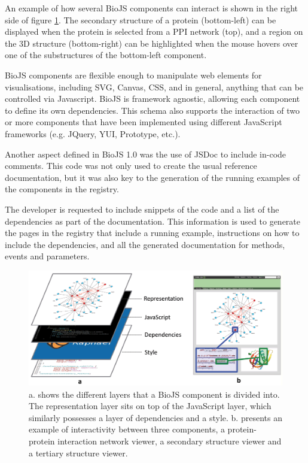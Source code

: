 An example of how several BioJS components can interact is shown in the right side of figure \ref{fig:biojs_layers}. The secondary structure of a protein (bottom-left) can be displayed when the protein is selected from a PPI network (top), and a region on the 3D structure (bottom-right) can be highlighted when the mouse hovers over one of the substructures of the bottom-left component.

BioJS components are flexible enough to manipulate web elements for visualisations, including SVG, Canvas, CSS, and in general, anything that can be controlled via Javascript. BioJS is framework agnostic, allowing each component to define its own dependencies. This schema also supports the interaction of two or more components that have been implemented using different JavaScript frameworks (e.g. JQuery, YUI, Prototype, etc.).
 
Another aspect defined in BioJS 1.0 was the use of JSDoc to include in-code comments. This code was not only used to create the usual reference documentation, but it was also key to the generation of the running examples of the components in the registry. 

The developer is requested to include snippets of the code and a list of the dependencies as part of the documentation. This information is used to generate the pages in the registry that include a running example, instructions on how to include the dependencies, and all the generated documentation for methods, events and parameters.

\begin{figure}  
\centering
\includegraphics[width=\textwidth]{figures/biojs_layers.png}
\caption[BioJS layers.]{a. shows the different layers that a BioJS component is divided into. The representation layer sits on top of the JavaScript layer, which similarly possesses a layer of dependencies and a style. b. presents an example of interactivity between three components, a protein-protein interaction network viewer, a secondary structure viewer and a tertiary structure viewer. 
\label{fig:biojs_layers}}
\end{figure}
 

